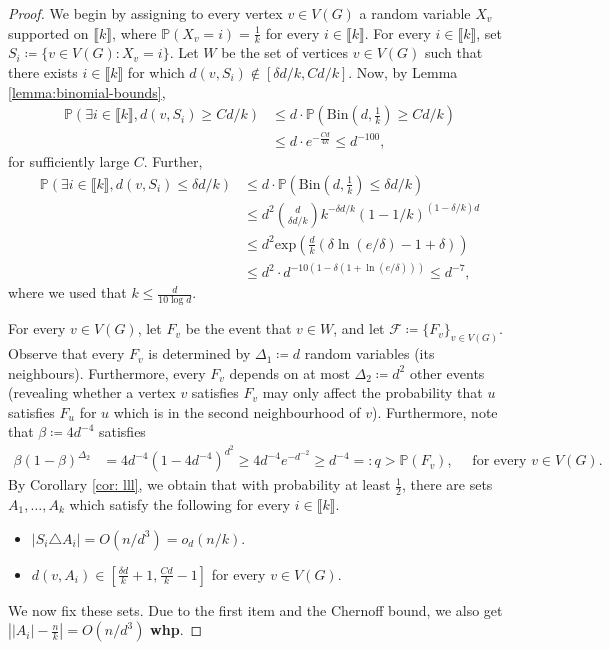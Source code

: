\documentclass[notitlepage]{scrartcl}
\renewcommand{\exp}{\text{exp}}
\newcommand{\br}[1]{\llbracket{#1}\rrbracket}
\begin{document}
\begin{proof}[Proof]
We begin by assigning to every vertex $v\in V(G)$ a random variable $X_v$ supported on $\br{k}$, where $\mathbb{P}(X_v = i)=\frac{1}{k}$ for every $i \in \br{k}$. For every $i \in \br{k}$, set $S_i \coloneqq \{v\in V(G)\colon X_v=i\}$. Let $W$ be the set of vertices $v \in V(G)$ such that there exists $i\in \br{k}$ for which $d(v,S_i)\notin[\delta d/k, Cd/k]$. Now, by Lemma \ref{lemma:binomial-bounds},
\begin{align*}
    \mathbb{P}\left(\exists i\in \br{k}, d(v,S_i)\ge Cd/k\right)&\le d\cdot \mathbb{P}\left(\text{Bin}\left(d,\frac{1}{k}\right)\ge Cd/k\right)\\
    &\le d\cdot e^{-\frac{Cd}{4k}}\le d^{-100},
\end{align*}
for sufficiently large $C$. Further, %
\begin{align*}
    \mathbb{P}\left(\exists i\in \br{k}, d(v,S_i)\le \delta d/k\right)
    &\le d\cdot \mathbb{P}\left(\text{Bin}\left(d,\frac{1}{k}\right)\le \delta d/k\right)\\
    &\le d^2{\binom{d}{\delta d/k}}k^{-\delta d/k}(1-1/k)^{(1-\delta/k)d}\\
    &\leq d^2\exp\left(\frac{d}{k}(\delta\ln (e/\delta)-1+\delta)\right)\\
    &\leq d^2\cdot d^{-10(1-\delta(1+\ln(e/\delta)))}\le d^{-7},
\end{align*}
where we used that $k\le \frac{d}{10\log d}$. 

For every $v\in V(G)$, let $F_v$ be the event that $v\in W$, and let $\mathcal{F}\coloneqq \{F_v\}_{v\in V(G)}$. Observe that every $F_v$ is determined by $\Delta_1\coloneqq d$ random variables (its neighbours). Furthermore, every $F_v$ depends on at most $\Delta_2\coloneqq d^2$ other events (revealing whether a vertex $v$ satisfies $F_v$ may only affect the probability that $u$ satisfies $F_u$ for $u$ which is in the second neighbourhood of $v$). Furthermore, note that $\beta\coloneqq 4d^{-4}$ satisfies 
\begin{align*}
    \beta(1-\beta)^{\Delta_2}&=4d^{-4}(1-4d^{-4})^{d^2}
    \ge 4d^{-4}e^{-d^{-2}}
    \ge d^{-4}=:q>\mathbb{P}(F_v),\quad\text{ for every $v\in V(G)$}.
\end{align*}
By Corollary \ref{cor: lll}, we obtain that with probability at least $\frac{1}{2}$, there are sets $A_1,\ldots, A_k$ which satisfy the following for every $i \in \br{k}$. 
\begin{itemize}
    \item $\left|S_i\triangle A_i\right|=O(n/d^3)=o_d(n/k)$.
    \item $d(v,A_i)\in \left[\frac{\delta d}{k}+1,\frac{Cd}{k}-1\right]$ for every $v \in V(G)$.
\end{itemize}
We now fix these sets. Due to the first item and the Chernoff bound, we also get $\left||A_i|-\frac{n}{k}\right|=O(n/d^{3})$ \textbf{whp}.



\end{proof}
\end{document}
